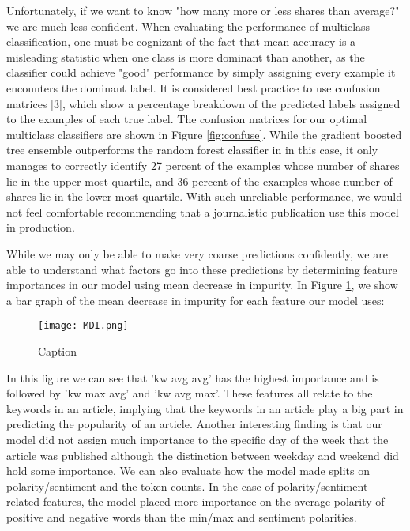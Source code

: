 \documentclass{article}
\begin{document}
Unfortunately, if we want to know "how many more or less shares than average?" we are much less confident. When evaluating the performance of multiclass classification, one must be cognizant of the fact that mean accuracy is a misleading statistic when one class is more dominant than another, as the classifier could achieve "good" performance by simply assigning every example it encounters the dominant label. It is considered best practice to use confusion matrices [3], which show a percentage breakdown of the predicted labels assigned to the examples of each true label. The confusion matrices for our optimal multiclass classifiers are shown in Figure \ref{fig:confuse}. While the gradient boosted tree ensemble outperforms the random forest classifier in in this case, it only manages to correctly identify 27 percent of the examples whose number of shares lie in the upper most quartile, and 36 percent of the examples whose number of shares lie in the lower most quartile. With such unreliable performance, we would not feel comfortable recommending that a journalistic publication use this model in production. 

While we may only be able to make very coarse predictions confidently, we are able to understand what factors go into these predictions by determining feature importances in our model using mean decrease in impurity. In Figure \ref{fig:MDI}, we show a bar graph of the mean decrease in impurity for each feature our model uses:

\begin{figure}[h!]
    \centering
    \texttt{[image: MDI.png]}
    \caption{Caption}
    \label{fig:MDI}
\end{figure}
In this figure we can see that 'kw avg avg' has the highest importance and is followed by 'kw max avg' and 'kw avg max'. These features all relate to the keywords in an article, implying that the keywords in an article play a big part in predicting the popularity of an article. Another interesting finding is that our model did not assign much importance to the specific day of the week that the article was published although the distinction between weekday and weekend did hold some importance. We can also evaluate how the model made splits on polarity/sentiment and the token counts. In the case of polarity/sentiment related features, the model placed more importance on the average polarity of positive and negative words than the min/max and sentiment polarities. \\
\end{document}
